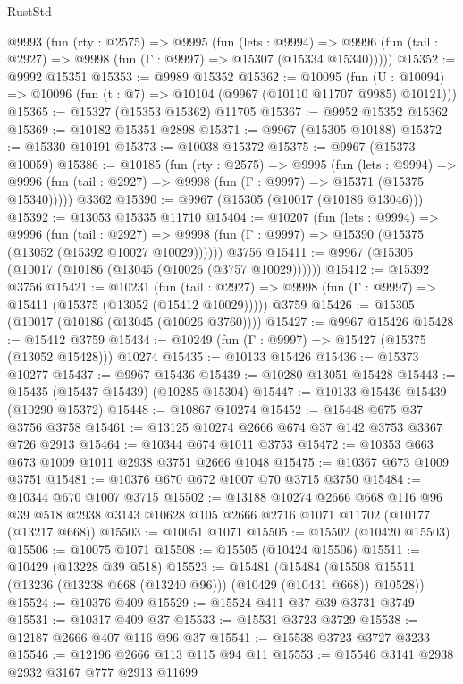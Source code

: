 \begin{lexlean}{RustStd}
\begin{coremodule}
  @9993
    (fun (rty : @2575) =>
    @9995
      (fun (lets : @9994) =>
      @9996 (fun (tail : @2927) => @9998 (fun (Γ : @9997) => @15307 (@15334 @15340)))))
@15352 := @9992 @15351
@15353 := @9989 @15352
@15362 := @10095
    (fun (U : @10094) => @10096 (fun (t : @7) => @10104 (@9967 (@10110 @11707 @9985) @10121)))
@15365 := @15327 (@15353 @15362) @11705
@15367 := @9952 @15352 @15362
@15369 := @10182 @15351 @2898
@15371 := @9967 (@15305 @10188)
@15372 := @15330 @10191
@15373 := @10038 @15372
@15375 := @9967 (@15373 @10059)
@15386 := @10185
    (fun (rty : @2575) =>
    @9995
      (fun (lets : @9994) =>
      @9996 (fun (tail : @2927) => @9998 (fun (Γ : @9997) => @15371 (@15375 @15340)))))
    @3362
@15390 := @9967 (@15305 (@10017 (@10186 @13046)))
@15392 := @13053 @15335 @11710
@15404 := @10207
    (fun (lets : @9994) =>
    @9996
      (fun (tail : @2927) =>
      @9998 (fun (Γ : @9997) => @15390 (@15375 (@13052 (@15392 @10027 @10029))))))
    @3756
@15411 := @9967 (@15305 (@10017 (@10186 (@13045 (@10026 (@3757 @10029))))))
@15412 := @15392 @3756
@15421 := @10231
    (fun (tail : @2927) => @9998 (fun (Γ : @9997) => @15411 (@15375 (@13052 (@15412 @10029)))))
    @3759
@15426 := @15305 (@10017 (@10186 (@13045 (@10026 @3760))))
@15427 := @9967 @15426
@15428 := @15412 @3759
@15434 := @10249 (fun (Γ : @9997) => @15427 (@15375 (@13052 @15428))) @10274
@15435 := @10133 @15426
@15436 := @15373 @10277
@15437 := @9967 @15436
@15439 := @10280 @13051 @15428
@15443 := @15435 (@15437 @15439) (@10285 @15304)
@15447 := @10133 @15436 @15439 (@10290 @15372)
@15448 := @10867 @10274
@15452 := @15448 @675 @37 @3756 @3758
@15461 := @13125 @10274 @2666 @674 @37 @142 @3753 @3367 @726 @2913
@15464 := @10344 @674 @1011 @3753
@15472 := @10353 @663 @673 @1009 @1011 @2938 @3751 @2666 @1048
@15475 := @10367 @673 @1009 @3751
@15481 := @10376 @670 @672 @1007 @70 @3715 @3750
@15484 := @10344 @670 @1007 @3715
@15502 := @13188
    @10274
    @2666
    @668
    @116
    @96
    @39
    @518
    @2938
    @3143
    @10628
    @105
    @2666
    @2716
    @1071
    @11702
    (@10177 (@13217 @668))
@15503 := @10051 @1071
@15505 := @15502 (@10420 @15503)
@15506 := @10075 @1071
@15508 := @15505 (@10424 @15506)
@15511 := @10429 (@13228 @39 @518)
@15523 := @15481
    (@15484 (@15508 @15511 (@13236 (@13238 @668 (@13240 @96))) (@10429 (@10431 @668)) @10528))
@15524 := @10376 @409
@15529 := @15524 @411 @37 @39 @3731 @3749
@15531 := @10317 @409 @37
@15533 := @15531 @3723 @3729
@15538 := @12187 @2666 @407 @116 @96 @37
@15541 := @15538 @3723 @3727 @3233
@15546 := @12196 @2666 @113 @115 @94 @11
@15553 := @15546 @3141 @2938 @2932 @3167 @777 @2913 @11699

\end{coremodule}
\end{lexlean}
